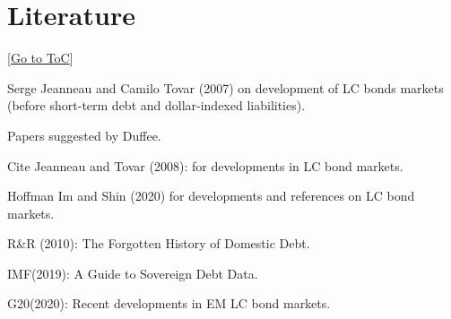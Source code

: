 \documentclass[12pt]{article}
\newcommand{\gototoc}{\vspace{-1.8cm} \null\hfill [\hyperlink{toc}{Go to ToC}] \newline}
\begin{document}
\section{Literature}
\gototoc
\begin{todolist}
	\item Serge Jeanneau and Camilo Tovar (2007) on development of LC bonds markets (before short-term debt and dollar-indexed liabilities).
	\item Papers suggested by Duffee.
	\item Cite Jeanneau and Tovar (2008): for developments in LC bond markets.
	\item Hoffman Im and Shin (2020) for developments and references on LC bond markets.
	\item R\&R (2010): The Forgotten History of Domestic Debt.
	\item IMF(2019): A Guide to Sovereign Debt Data.
	\item G20(2020): Recent developments in EM LC bond markets.
\end{todolist}
\end{document}
